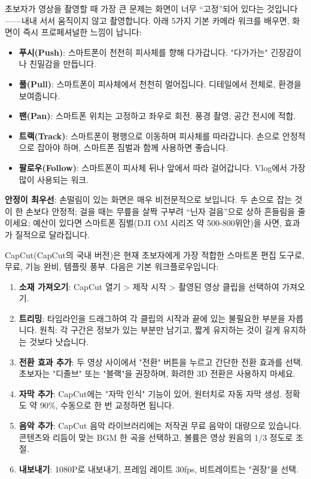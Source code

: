 
초보자가 영상을 촬영할 때 가장 큰 문제는 화면이 너무 “고정”되어 있다는 것입니다——내내 서서 움직이지 않고 촬영합니다. 아래 5가지 기본 카메라 워크를 배우면, 화면이 즉시 프로페셔널한 느낌이 납니다:

\begin{itemize}
  \item \textbf{푸시(Push)}: 스마트폰이 천천히 피사체를 향해 다가갑니다. "다가가는" 긴장감이나 친밀감을 만듭니다.
  \item \textbf{풀(Pull)}: 스마트폰이 피사체에서 천천히 멀어집니다. 디테일에서 전체로, 환경을 보여줍니다.
  \item \textbf{팬(Pan)}: 스마트폰 위치는 고정하고 좌우로 회전. 풍경 촬영, 공간 전시에 적합.
  \item \textbf{트랙(Track)}: 스마트폰이 평행으로 이동하며 피사체를 따라갑니다. 손으로 안정적으로 잡아야 하며, 스마트폰 짐벌과 함께 사용하면 좋습니다.
  \item \textbf{팔로우(Follow)}: 스마트폰이 피사체 뒤나 앞에서 따라 걸어갑니다. Vlog에서 가장 많이 사용되는 워크.
\end{itemize}

\textbf{안정이 최우선}: 손떨림이 있는 화면은 매우 비전문적으로 보입니다. 두 손으로 잡는 것이 한 손보다 안정적; 걸을 때는 무릎을 살짝 구부려 “닌자 걸음”으로 상하 흔들림을 줄이세요; 예산이 있다면 스마트폰 짐벌(DJI OM 시리즈 약 500-800위안)을 사면, 효과가 질적으로 달라집니다.


CapCut(CapCut의 국내 버전)은 현재 초보자에게 가장 적합한 스마트폰 편집 도구로, 무료, 기능 완비, 템플릿 풍부. 다음은 기본 워크플로우입니다:

\begin{enumerate}
  \item \textbf{소재 가져오기}: CapCut 열기 > 제작 시작 > 촬영된 영상 클립을 선택하여 가져오기.
  \item \textbf{트리밍}: 타임라인을 드래그하여 각 클립의 시작과 끝에 있는 불필요한 부분을 자릅니다. 원칙: 각 구간은 정보가 있는 부분만 남기고, 짧게 유지하는 것이 길게 유지하는 것보다 낫습니다.
  \item \textbf{전환 효과 추가}: 두 영상 사이에서 "전환" 버튼을 누르고 간단한 전환 효과를 선택. 초보자는 "디졸브" 또는 "블랙"을 권장하며, 화려한 3D 전환은 사용하지 마세요.
  \item \textbf{자막 추가}: CapCut에는 "자막 인식" 기능이 있어, 원터치로 자동 자막 생성. 정확도 약 90\%, 수동으로 한 번 교정하면 됩니다.
  \item \textbf{음악 추가}: CapCut 음악 라이브러리에는 저작권 무료 음악이 대량으로 있습니다. 콘텐츠와 리듬이 맞는 BGM 한 곡을 선택하고, 볼륨은 영상 원음의 1/3 정도로 조절.
  \item \textbf{내보내기}: 1080P로 내보내기, 프레임 레이트 30fps, 비트레이트는 "권장"을 선택.
\end{enumerate}

